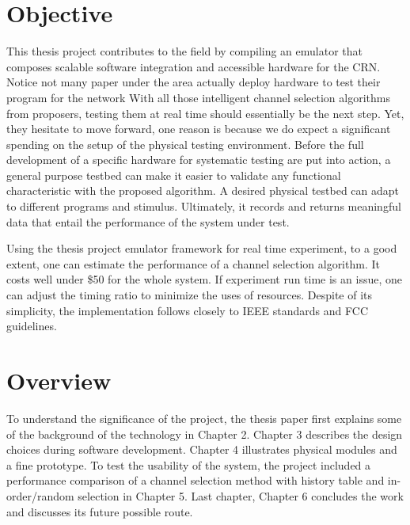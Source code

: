 \section{Objective}
This thesis project contributes to the field by compiling an emulator that composes scalable software integration and accessible
hardware for the CRN. Notice not many paper under the area actually deploy hardware to test their program for the network 
With all those intelligent channel selection algorithms from proposers, testing them at real time should essentially be the 
next step. Yet, they hesitate to move forward, one reason is because we do expect a significant spending on the setup of the physical 
testing environment. Before the full development of a specific hardware for systematic testing are put into action, a general purpose testbed 
can make it easier to validate any functional characteristic with the proposed algorithm. 
A desired physical testbed can adapt to different programs and stimulus. Ultimately, it records and returns meaningful data that entail the performance of the system under test.

Using the thesis project emulator framework for real time experiment, to a good extent, one can estimate the performance of a channel 
selection algorithm. It costs well under \$50 for the whole system. If experiment run time is an issue, one can adjust
the timing ratio to minimize the uses of resources. Despite of its simplicity, the implementation follows closely to IEEE
standards and FCC guidelines.


\section{Overview}
To understand the significance of the project, the thesis paper first explains some of the background of the technology in Chapter 2.
Chapter 3 describes the design choices during software development. Chapter 4 illustrates physical modules and a fine prototype.
To test the usability of the system, the project included a performance comparison of a channel selection method with history table and in-order/random selection in Chapter 5. Last chapter, Chapter 6 concludes the work and discusses its future possible route. 






